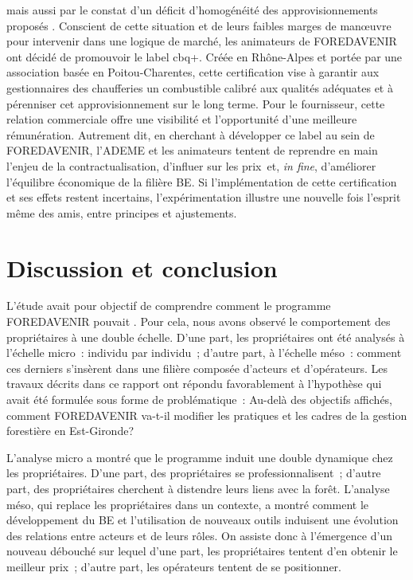 \documentclass[12pt]{report}
\newcommand\indexp[1]{#1\index{#1}}
\begin{document}
mais aussi par le constat d’un déficit d’homogénéité des approvisionnements
proposés \citep{BEbanosDehez_ref78}. Conscient de cette situation et de leurs
faibles marges de man\oe{}uvre pour intervenir dans une logique de marché, les
animateurs de FOREDAVENIR ont décidé de promouvoir le label \gls{cbq+}. Créée en
Rhône-Alpes et portée par une association basée en Poitou-Charentes, cette
certification vise à garantir aux gestionnaires des chaufferies un combustible
calibré aux qualités adéquates et à pérenniser cet approvisionnement sur le long
terme. Pour le fournisseur, cette relation commerciale offre une visibilité et
l’opportunité d’une meilleure rémunération. Autrement dit, en cherchant à
développer ce label au sein de FOREDAVENIR, l’ADEME et les animateurs tentent de
reprendre en main l’enjeu de la contractualisation, d’influer sur les prix et,
\textit{in fine}, d’améliorer l’équilibre économique de la filière BE. Si
l’implémentation de cette certification et ses effets restent incertains,
l’expérimentation illustre une nouvelle fois l’esprit même des \glspl{ami},
entre principes et ajustements.

\chapter{Discussion et conclusion}

L'étude avait pour objectif de comprendre comment le programme \indexp{FOREDAVENIR}
pouvait . Pour cela, nous avons observé le comportement des propriétaires à
une double échelle. D'une part, les propriétaires ont été analysés à l'échelle
micro~: individu par individu~; d'autre part, à l'échelle méso~: comment ces
derniers s'insèrent dans une filière composée d'acteurs et d'opérateurs. 
Les travaux décrits dans ce rapport ont répondu favorablement à l'hypothèse
qui avait été formulée sous forme de problématique~: Au-delà des objectifs
affichés, comment FOREDAVENIR va-t-il modifier les pratiques et les cadres de la
gestion forestière en Est-Gironde?

L'analyse micro a montré que le programme induit une double dynamique chez les
propriétaires. D'une part, des propriétaires se professionnalisent~; d'autre
part, des propriétaires cherchent à distendre leurs liens avec la forêt. L'analyse
méso, qui replace les propriétaires dans un contexte, a montré comment le
développement du BE et l'utilisation de nouveaux outils induisent une évolution
des relations entre acteurs et de leurs rôles. On assiste donc à l'émergence
d'un nouveau débouché sur lequel d'une part, les propriétaires tentent d'en
obtenir le meilleur prix~; d'autre part, les  opérateurs tentent de se
positionner.\\
\end{document}
